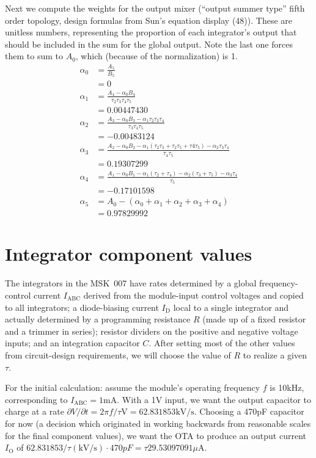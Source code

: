 Next we compute the weights for the output mixer (``output summer type''
fifth order topology, design formulas from Sun's equation display (48)). 
These are unitless numbers, representing the proportion of each integrator's
output that should be included in the sum for the global output.  Note the
last one forces them to sum to $A_0$, which (because of the normalization)
is 1.
\begin{align*}
  \alpha_0 &= \frac{A_5}{B_5} \\
    &= 0 \\
  \alpha_1 &= \frac{A_4-\alpha_0B_4}{\tau_2\tau_3\tau_4\tau_5} \\
    &= 0.00447430 \\
  \alpha_2 &=
    \frac{A_3-\alpha_0B_3-\alpha_1\tau_2\tau_3\tau_4}{\tau_3\tau_4\tau_5} \\
    &= -0.00483124 \\
  \alpha_3 &= \frac{A_2-\alpha_0B_2-\alpha_1(\tau_2\tau_3+\tau_2\tau_5+
      \tau4\tau_5)-\alpha_2\tau_3\tau_4}{\tau_4\tau_5} \\
    &= 0.19307299 \\
  \alpha_4 &= \frac{A_1-\alpha_0B_1-\alpha_1(\tau_2+\tau_4)
      -\alpha_2(\tau_3+\tau_5) -\alpha_3\tau_4}{\tau_5} \\
    &= -0.17101598 \\
  \alpha_5 &= A_0-(\alpha_0+\alpha_1+\alpha_2+\alpha_3+\alpha_4) \\
    &= 0.97829992
\end{align*}

\section{Integrator component values}

The integrators in the MSK~007 have rates determined by a global
frequency-control current $I_\textrm{ABC}$ derived from the module-input
control voltages and copied to all integrators; a diode-biasing current
$I_\textrm{D}$ local to a single integrator and actually determined by a
programming resistance $R$ (made up of a fixed resistor and a
trimmer in series); resistor dividers on the positive and negative
voltage inputs; and an integration capacitor $C$.  After setting most of the
other values from circuit-design requirements, we
will choose the value of $R$ to realize a given $\tau$.

For the initial calculation:  assume the module's operating frequency $f$ is
10kHz, corresponding to $I_\textrm{ABC}=1\textrm{mA}$.  With a 1V input, we
want the output capacitor to charge at a rate $\partial V/\partial
t=2\pi f/\tau\textrm{V}=62.831853\textrm{kV}/\textrm{s}$.  Choosing a
470pF capacitor for now (a decision which originated in working backwards
from reasonable scales for the final component values), we want the OTA to
produce an output current $I_\textrm{O}$ of
$62.831853/\tau(\textrm{kV}/\textrm{s})\cdot470pF = \tau29.53097091
\mu\textrm{A}$.


